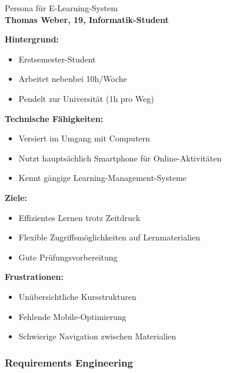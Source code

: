 \begin{example2}{Persona für E-Learning-System}\\
\textbf{Thomas Weber, 19, Informatik-Student}

\textbf{Hintergrund:}
\begin{itemize}
    \item Erstsemester-Student
    \item Arbeitet nebenbei 10h/Woche
    \item Pendelt zur Universität (1h pro Weg)
\end{itemize}

\textbf{Technische Fähigkeiten:}
\begin{itemize}
    \item Versiert im Umgang mit Computern
    \item Nutzt hauptsächlich Smartphone für Online-Aktivitäten
    \item Kennt gängige Learning-Management-Systeme
\end{itemize}

\textbf{Ziele:}
\begin{itemize}
    \item Effizientes Lernen trotz Zeitdruck
    \item Flexible Zugriffsmöglichkeiten auf Lernmaterialien
    \item Gute Prüfungsvorbereitung
\end{itemize}

\textbf{Frustrationen:}
\begin{itemize}
    \item Unübersichtliche Kursstrukturen
    \item Fehlende Mobile-Optimierung
    \item Schwierige Navigation zwischen Materialien
\end{itemize}
\end{example2}


\columnbreak


\subsubsection{Requirements Engineering}

